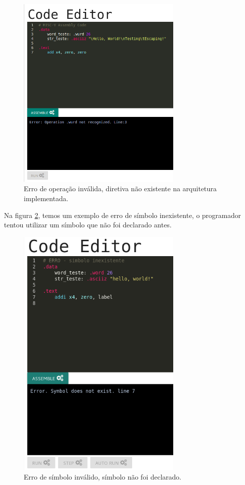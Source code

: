 	\begin{figure}[h!]
	  \centering
	  \includegraphics[width=8cm]{img/assemble_error_op_not_recog_directives.png}
	  \caption{Erro de operação inválida, diretiva não existente na arquitetura implementada.}
	  \label{fig:assemble_error_op_not_recog_directives}
	\end{figure}

	 Na figura \ref{fig:assemble_error_simbolo_inexistente}, temos um exemplo de erro de símbolo inexistente, o programador tentou utilizar um símbolo que não foi declarado antes.
	\begin{figure}[!]
	  \centering
	  \includegraphics[width=8cm]{img/assemble_error_simbolo_inexistente.png}
	  \caption{Erro de símbolo inválido, símbolo não foi declarado.}
	  \label{fig:assemble_error_simbolo_inexistente}
	\end{figure}

